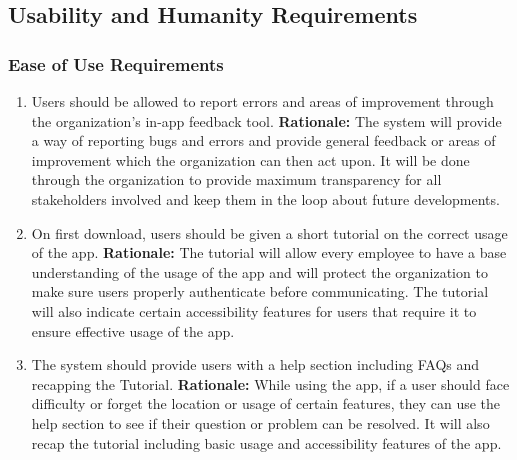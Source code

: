\documentclass[]{article}
\begin{document}

\subsection{Usability and Humanity Requirements}
\label{sub:usability_and_humanity_requirements}

\subsubsection{Ease of Use Requirements}
\label{ssub:ease_of_use_requirements}
\begin{enumerate}[{UH-EOU}1. ]
	\item Users should be allowed to report errors and areas of improvement through the organization’s in-app feedback tool. \newline
	      \textbf{Rationale:} The system will provide a way of reporting bugs and errors and provide general feedback or areas of improvement which the organization can then act upon. It will be done through the organization to provide maximum transparency for all stakeholders involved and keep them in the loop about future developments.
	\item On first download, users should be given a short tutorial on the correct usage of the app. \newline
	      \textbf{Rationale:} The tutorial will allow every employee to have a base understanding of the usage of the app and will protect the organization to make sure users properly authenticate before communicating. The tutorial will also indicate certain accessibility features for users that require it to ensure effective usage of the app.
	\item  The system should provide users with a help section including FAQs and recapping the Tutorial. \newline
	      \textbf{Rationale:} While using the app, if a user should face difficulty or forget the location or usage of certain features, they can use the help section to see if their question or problem can be resolved. It will also recap the tutorial including basic usage and accessibility features of the app.
\end{enumerate}
\end{document}
